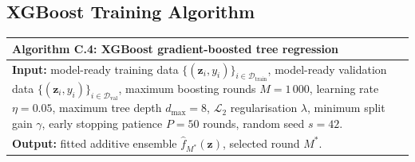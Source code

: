 \subsection{XGBoost Training Algorithm}
\label{annexure:xgb_algorithm}

\begin{table}[H]
\centering
{\small
\renewcommand{\arraystretch}{1.15}
\begin{tabular}{p{}}
\toprule
\textbf{Algorithm C.4: XGBoost gradient-boosted tree regression} \\
\midrule
\textbf{Input:} model-ready training data
$\{(\mathbf{z}_i, y_i)\}_{i \in \mathcal{D}_{\mathrm{train}}}$,
model-ready validation data
$\{(\mathbf{z}_i, y_i)\}_{i \in \mathcal{D}_{\mathrm{val}}}$,
maximum boosting rounds $M = 1\,000$, learning rate $\eta = 0.05$,
maximum tree depth $d_{\max} = 8$, $\mathcal{L}_2$ regularisation
$\lambda$, minimum split gain $\gamma$, early stopping patience
$P = 50$ rounds, random seed $s = 42$. \\[3pt]

\textbf{Output:} fitted additive ensemble
$\hat{f}_{M^{*}}(\mathbf{z})$, selected round $M^{*}$. \\[3pt]


\end{tabular}}
\end{table}
